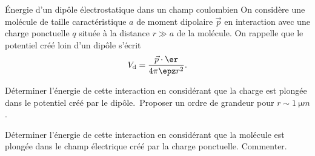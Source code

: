   \begin{exo}[PC][1][TD]{Énergie d'un dipôle électrostatique dans un champ coulombien}
  On considère une molécule de taille caractéristique $a$ de moment dipolaire $\Vec{p}$ en interaction avec une charge ponctuelle $q$ située à la distance $r \gg a$ de la molécule. On rappelle que le potentiel créé loin d'un dipôle s'écrit
  \begin{equation}
    V_{\rm{d}}=\frac{\Vec{p} \cdot \er}{4 \pi \epz r^2}.
  \end{equation}
  \begin{quest}
    \item Déterminer l'énergie de cette interaction en considérant que la charge est plongée dans le potentiel créé par le dipôle.\, Proposer un ordre de grandeur pour $r \sim \SI{1}{\micro m}$.
    \item Déterminer l'énergie de cette interaction en considérant que la molécule est plongée dans le champ électrique créé par la charge ponctuelle. Commenter.
  \end{quest}
  \end{exo}


